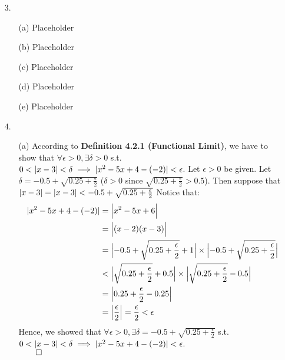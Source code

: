 \documentclass[11pt]{article}
\DeclarePairedDelimiter\abs{\lvert}{\rvert}%
\DeclarePairedDelimiter\absb{\Big\lvert}{\Big\rvert}%
\begin{document}
\begin{itemize}
    \item[3.]
        \begin{itemize}
            \item[(a)]
                Placeholder

            \item[(b)]
                Placeholder

            \item[(c)]
                Placeholder

            \item[(d)]
                Placeholder

            \item[(e)]
                Placeholder
        \end{itemize}

    \item[4.]
        \begin{itemize}
            \item[(a)]
                According to \textbf{Definition 4.2.1 (Functional Limit)},
                we have to show that $\forall \epsilon > 0, \exists \delta > 0$
                s.t. $0 < \abs{x - 3} < \delta \implies \abs{x^2 - 5x + 4 -
                (-2)} < \epsilon$. Let $\epsilon > 0$ be given. Let
                $\delta = -0.5 + \sqrt{0.25 + \frac{\epsilon}{2}}$
                ($\delta > 0$ since $\sqrt{0.25 + \frac{\epsilon}{2}} > 0.5$).
                Then suppose that $\abs{x - 3} = \abs{x - 3} < -0.5 +
                \sqrt{0.25 + \frac{\epsilon}{2}}$
                Notice that:
                \begin{align*}
                    \abs{x^2 - 5x + 4 - (-2)} &= \absb{x^2 - 5x + 6}\\
                                              &= \absb{(x - 2)(x - 3)}\\
                                              &= \absb{-0.5 + \sqrt{0.25 + \frac{\epsilon}{2}} + 1} \times \absb{-0.5 + \sqrt{0.25 + \frac{\epsilon}{2}}}\\
                                              &< \absb{\sqrt{0.25 + \frac{\epsilon}{2}} + 0.5} \times \absb{\sqrt{0.25 + \frac{\epsilon}{2}} - 0.5}\\
                                              &= \absb{0.25 + \frac{\epsilon}{2} - 0.25}\\
                                              &= \absb{\frac{\epsilon}{2}} = \frac{\epsilon}{2} < \epsilon
                \end{align*}
                Hence, we showed that $\forall \epsilon > 0, \exists \delta =
                -0.5 + \sqrt{0.25 + \frac{\epsilon}{2}}$ s.t.
                $0 < \abs{x - 3} < \delta \implies \abs{x^2 - 5x + 4 - (-2)} <
                \epsilon$.\\
                $\qed$


\end{itemize}
\end{itemize}
\end{document}
